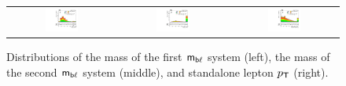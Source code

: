 \begin{figure}[tbh!]
 \begin{center}
 \begin{tabular}{ccc}
  \includegraphics[width=0.325\textwidth]{figures/Appendix/SRMC/Mbl1}&
    \includegraphics[width=0.325\textwidth]{figures/Appendix/SRMC/Mbl2}&
  \includegraphics[width=0.325\textwidth]{figures/Appendix/SRMC/BaPt}\\
 \end{tabular}
 \caption{Distributions of the mass of the first $\textsf{m}_{\textsf{b}\ell}$ system (left), the mass of the second $\textsf{m}_{\textsf{b}\ell}$ system (middle), and standalone lepton $p_{\textsf{T}}$ (right).}
 \label{fig:input_vali_6}
 \end{center}
\end{figure}